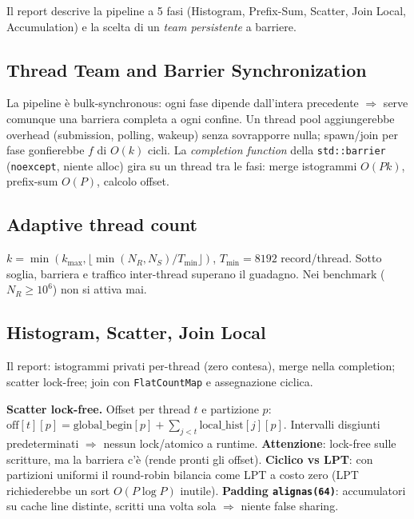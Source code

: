 \documentclass[11pt,a4paper]{article}
\begin{document}
Il report descrive la pipeline a 5 fasi (Histogram, Prefix-Sum, Scatter, Join Local, Accumulation) e la scelta di un \emph{team persistente} a barriere.

\subsection{Thread Team and Barrier Synchronization}

\begin{motiv}
La pipeline è bulk-synchronous: ogni fase dipende dall'intera precedente $\Rightarrow$ serve comunque una barriera completa a ogni confine. Un thread pool aggiungerebbe overhead (submission, polling, wakeup) senza sovrapporre nulla; spawn/join per fase gonfierebbe $f$ di $O(k)$ cicli. La \emph{completion function} della \texttt{std::barrier} (\texttt{noexcept}, niente alloc) gira su un thread tra le fasi: merge istogrammi $O(Pk)$, prefix-sum $O(P)$, calcolo offset.
\end{motiv}

\subsection{Adaptive thread count}

\begin{deriv}
$k=\min(k_{\max},\lfloor\min(N_R,N_S)/T_{\min}\rfloor)$, $T_{\min}=8192$ record/thread. Sotto soglia, barriera e traffico inter-thread superano il guadagno. Nei benchmark ($N_R\ge10^6$) non si attiva mai.
\end{deriv}

\subsection{Histogram, Scatter, Join Local}

Il report: istogrammi privati per-thread (zero contesa), merge nella completion; scatter lock-free; join con \texttt{FlatCountMap} e assegnazione ciclica.

\begin{deriv}
\textbf{Scatter lock-free.} Offset per thread $t$ e partizione $p$: $\text{off}[t][p]=\text{global\_begin}[p]+\sum_{j<t}\text{local\_hist}[j][p]$. Intervalli disgiunti predeterminati $\Rightarrow$ nessun lock/atomico a runtime. \textbf{Attenzione}: lock-free sulle scritture, ma la barriera c'è (rende pronti gli offset). \textbf{Ciclico vs LPT}: con partizioni uniformi il round-robin bilancia come LPT a costo zero (LPT richiederebbe un sort $O(P\log P)$ inutile). \textbf{Padding \texttt{alignas(64)}}: accumulatori su cache line distinte, scritti una volta sola $\Rightarrow$ niente false sharing.
\end{deriv}
\end{document}
